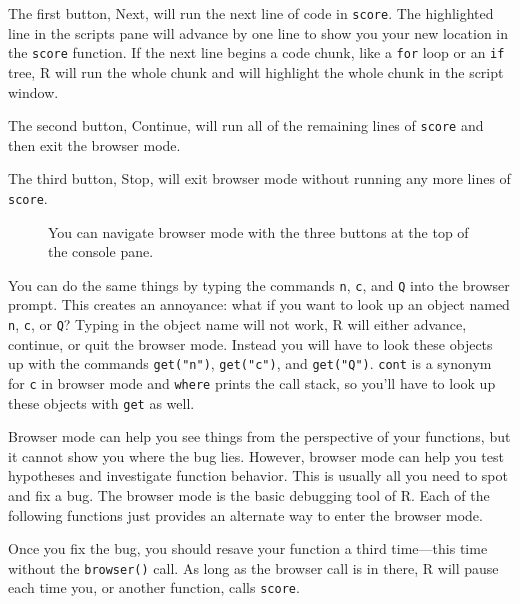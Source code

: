\documentclass[
  letterpaper,
  DIV=11,
  numbers=noendperiod]{scrbook}
\begin{document}
The first button, Next, will run the next line of code in
\texttt{score}. The highlighted line in the scripts pane will advance by
one line to show you your new location in the \texttt{score} function.
If the next line begins a code chunk, like a \texttt{for} loop or an
\texttt{if} tree, R will run the whole chunk and will highlight the
whole chunk in the script window.

The second button, Continue, will run all of the remaining lines of
\texttt{score} and then exit the browser mode.

The third button, Stop, will exit browser mode without running any more
lines of \texttt{score}.

\begin{figure}


\caption{\label{fig-browser-buttons}You can navigate browser mode with
the three buttons at the top of the console pane.}

\end{figure}%

You can do the same things by typing the commands \texttt{n},
\texttt{c}, and \texttt{Q} into the browser prompt. This creates an
annoyance: what if you want to look up an object named \texttt{n},
\texttt{c}, or \texttt{Q}? Typing in the object name will not work, R
will either advance, continue, or quit the browser mode. Instead you
will have to look these objects up with the commands \texttt{get("n")},
\texttt{get("c")}, and \texttt{get("Q")}. \texttt{cont} is a synonym for
\texttt{c} in browser mode and \texttt{where} prints the call stack, so
you'll have to look up these objects with \texttt{get} as well.

Browser mode can help you see things from the perspective of your
functions, but it cannot show you where the bug lies. However, browser
mode can help you test hypotheses and investigate function behavior.
This is usually all you need to spot and fix a bug. The browser mode is
the basic debugging tool of R. Each of the following functions just
provides an alternate way to enter the browser mode.

Once you fix the bug, you should resave your function a third
time---this time without the \texttt{browser()} call. As long as the
browser call is in there, R will pause each time you, or another
function, calls \texttt{score}.
\end{document}
